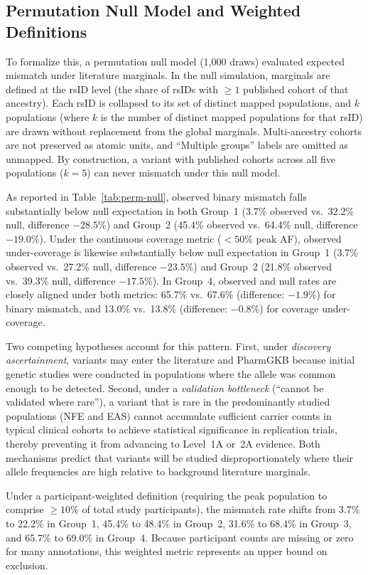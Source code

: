 \documentclass[conference]{IEEEtran}
\begin{document}
\begin{table}[!t]
\subsection{Permutation Null Model and Weighted Definitions}

To formalize this, a permutation null model (1,000 draws) evaluated expected mismatch under literature marginals.
In the null simulation, marginals are defined at the rsID level (the share of rsIDs with $\ge 1$ published cohort of that ancestry).
Each rsID is collapsed to its set of distinct mapped populations, and $k$ populations (where $k$ is the number of distinct mapped populations for that rsID) are drawn without replacement from the global marginals.
Multi-ancestry cohorts are not preserved as atomic units, and ``Multiple groups'' labels are omitted as unmapped.
By construction, a variant with published cohorts across all five populations ($k = 5$) can never mismatch under this null model.

As reported in Table~\ref{tab:perm-null}, observed binary mismatch falls substantially below null expectation in both Group~1 (3.7\% observed vs.\ 32.2\% null, difference $-28.5\%$) and Group~2 (45.4\% observed vs.\ 64.4\% null, difference $-19.0\%$).
Under the continuous coverage metric ($< 50\%$ peak AF), observed under-coverage is likewise substantially below null expectation in Group~1 (3.7\% observed vs.\ 27.2\% null, difference $-23.5\%$) and Group~2 (21.8\% observed vs.\ 39.3\% null, difference $-17.5\%$).
In Group~4, observed and null rates are closely aligned under both metrics: 65.7\% vs.\ 67.6\% (difference: $-1.9\%$) for binary mismatch, and 13.0\% vs.\ 13.8\% (difference: $-0.8\%$) for coverage under-coverage.

Two competing hypotheses account for this pattern.
First, under \emph{discovery ascertainment}, variants may enter the literature and PharmGKB because initial genetic studies were conducted in populations where the allele was common enough to be detected.
Second, under a \emph{validation bottleneck} (``cannot be validated where rare''), a variant that is rare in the predominantly studied populations (NFE and EAS) cannot accumulate sufficient carrier counts in typical clinical cohorts to achieve statistical significance in replication trials, thereby preventing it from advancing to Level~1A or~2A evidence.
Both mechanisms predict that variants will be studied disproportionately where their allele frequencies are high relative to background literature marginals.

Under a participant-weighted definition (requiring the peak population to comprise $\ge 10\%$ of total study participants), the mismatch rate shifts from 3.7\% to 22.2\% in Group~1, 45.4\% to 48.4\% in Group~2, 31.6\% to 68.4\% in Group~3, and 65.7\% to 69.0\% in Group~4.
Because participant counts are missing or zero for many annotations, this weighted metric represents an upper bound on exclusion.


\end{table}
\end{document}
